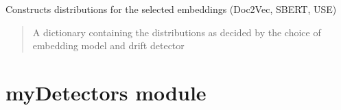 \documentclass[letterpaper,10pt,english]{sphinxmanual}
\begin{document}
\begin{fulllineitems}
\begin{fulllineitems}
\end{fulllineitems}


\begin{fulllineitems}
\label{\detokenize{fldModules/distributions:distributions.distributions.final_distributions}}
\pysigstartsignatures
{}
\pysigstopsignatures
\sphinxAtStartPar
Constructs distributions for the selected embeddings (Doc2Vec, SBERT, USE)
\begin{quote}\begin{description}
\sphinxAtStartPar
A dictionary containing the distributions as decided by the choice of embedding model and drift detector

\end{description}\end{quote}

\end{fulllineitems}


\begin{fulllineitems}
\label{\detokenize{fldModules/distributions:distributions.distributions.kde}}
\pysigstartsignatures
{}
\pysigstopsignatures
\end{fulllineitems}


\end{fulllineitems}


\sphinxstepscope


\section{myDetectors module}
\label{\detokenize{fldModules/myDetectors:module-myDetectors}}\label{\detokenize{fldModules/myDetectors:mydetectors-module}}\label{\detokenize{fldModules/myDetectors::doc}}
\end{document}
